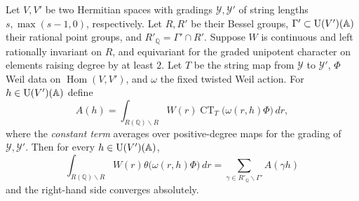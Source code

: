 \begin{lemma}
\label{lem:a-bessel-orbit-unfold}
\emitthmsource
Let $V,V'$ be two Hermitian spaces with gradings $\mathcal Y,\mathcal Y'$ of string lengths $s,\max(s-1,0)$, respectively. Let $R,R'$ be their Bessel groups, $\Gamma'\subset \operatorname{U}(V')(\mathbb A)$ their rational point groups, and $R'_{\mathbb Q}=\Gamma'\cap R'$. Suppose $W$ is continuous and left rationally invariant on $R$, and equivariant for the graded unipotent character on elements raising degree by at least $2$. Let $T$ be the string map from $\mathcal Y$ to $\mathcal Y'$, $\Phi$ Weil data on $\operatorname{Hom}(V,V')$, and $\omega$ the fixed twisted Weil action. For $h\in \operatorname{U}(V')(\mathbb A)$ define
\[
 A(h)=\int_{R(\mathbb Q)\backslash R}W(r)
        \operatorname{CT}_{T}\bigl(\omega(r,h)\Phi\bigr)\,dr ,
\]
where the \emph{constant term} averages over positive-degree maps for the grading of $\mathcal Y,\mathcal Y'$. Then for every $h\in \operatorname{U}(V')(\mathbb A)$,
\[
 \int_{R(\mathbb Q)\backslash R}
       W(r)\theta\bigl(\omega(r,h)\Phi\bigr)\,dr
   =\sum_{\gamma\in R'_{\mathbb Q}\backslash\Gamma'} A(\gamma h)
\]
and the right-hand side converges absolutely.
\end{lemma}

